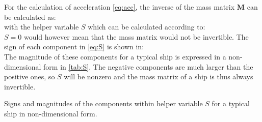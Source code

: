 For the calculation of acceleration \autoref{eq:acc}, the inverse of the mass matrix $\mathbf{M}$ can be calculated as:
\begin{equation}
    \label{eq:M_inv}
    
\end{equation}
with the helper variable $S$ which can be calculated according to: 
\begin{equation}
    \label{eq:S}
    
\end{equation}
$S=0$ would however mean that the mass matrix would not be invertible. The sign of each component in \autoref{eq:S} is shown in:
\begin{equation}
    \label{eq:S_sign}
    
\end{equation}
The magnitude of these components for a typical ship is expressed in a non-dimensional form in \autoref{tab:S}. The negative components are much larger than the positive ones, so $S$ will be nonzero and the mass matrix of a ship is thus always invertible.      
\begin{table}[h]
    \centering
    \small
    \caption{Signs and magnitudes of the components within helper variable $S$ for a typical ship in non-dimensional form.}
    \label{tab:S}
\end{table}
\FloatBarrier
